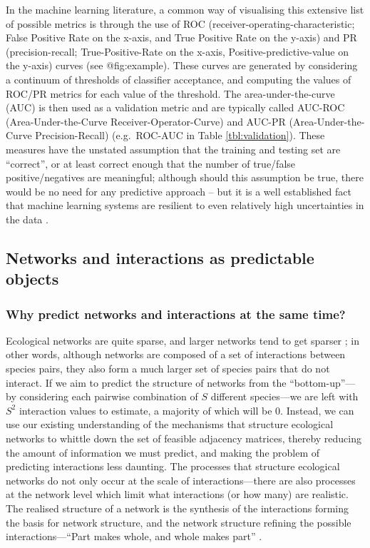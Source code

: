 In the machine learning literature, a common way of visualising this
extensive list of possible metrics is through the use of ROC
(receiver-operating-characteristic; False Positive Rate on the x-axis,
and True Positive Rate on the y-axis) and PR (precision-recall;
True-Positive-Rate on the x-axis, Positive-predictive-value on the
y-axis) curves (see @fig:example). These curves are generated by
considering a continuum of thresholds of classifier acceptance, and
computing the values of ROC/PR metrics for each value of the threshold.
The area-under-the-curve (AUC) is then used as a validation metric and
are typically called AUC-ROC (Area-Under-the-Curve
Receiver-Operator-Curve) and AUC-PR (Area-Under-the-Curve
Precision-Recall) (e.g.~ROC-AUC in Table \ref{tbl:validation}). These measures have
the unstated assumption that the training and testing set are
``correct'', or at least correct enough that the number of true/false
positive/negatives are meaningful; although should this assumption be
true, there would be no need for any predictive approach -- but it is a
well established fact that machine learning systems are resilient to
even relatively high uncertainties in the data \cite{Halevy2009UnrEff}.

\subsection{Networks and interactions as predictable
objects}\label{networks-and-interactions-as-predictable-objects}

\subsubsection{Why predict networks and interactions at the same
time?}\label{why-predict-networks-and-interactions-at-the-same-time}

Ecological networks are quite sparse, and larger networks tend to get
sparser \cite{MacDonald2020RevLin}; in other words, although networks
are composed of a set of interactions between species pairs, they also
form a much larger set of species pairs that do not interact. If we aim
to predict the structure of networks from the ``bottom-up''--- by
considering each pairwise combination of \(S\) different species---we
are left with \(S^2\) interaction values to estimate, a majority of
which will be 0. Instead, we can use our existing understanding of the
mechanisms that structure ecological networks to whittle down the set of
feasible adjacency matrices, thereby reducing the amount of information
we must predict, and making the problem of predicting interactions less
daunting. The processes that structure ecological networks do not only
occur at the scale of interactions---there are also processes at the
network level which limit what interactions (or how many) are realistic.
The realised structure of a network is the synthesis of the interactions
forming the basis for network structure, and the network structure
refining the possible interactions---``Part makes whole, and whole makes
part'' \cite{Levins1987DiaBio}.

